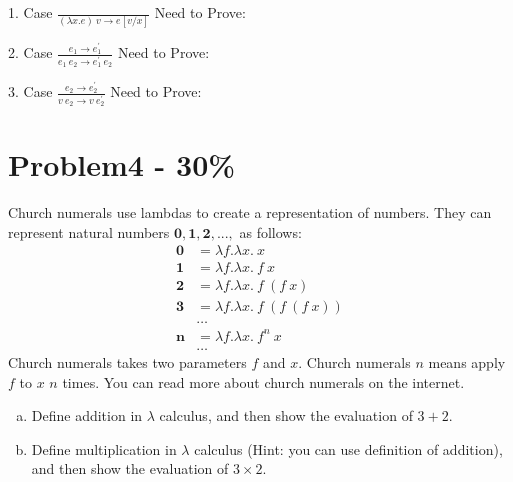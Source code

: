 \documentclass{article}
\newcommand{\answerbox}{
    \vspace{7cm} %
}
\begin{document}
1. Case $\frac{}{(\lambda x.e)\ v \rightarrow e [v/x]}$
Need to Prove:
\answerbox

2. Case $\frac{e_1 \rightarrow e_1^{'}}{e_1\ e_2 \rightarrow e_1^{'}\ e_2}$
Need to Prove:
\answerbox

3. Case $\frac{e_2 \rightarrow e_2^{'}}{v\ e_2 \rightarrow v\ e_2^{'}}$
Need to Prove:
\answerbox


\section*{Problem4 - 30\%}
Church numerals use lambdas to create a representation of numbers.
They can represent natural numbers $\mathbf{0}, \mathbf{1}, \mathbf{2}, ...,$ as follows:
\begin{align*}
    \mathbf{0} &= \lambda f.\lambda x.\ x \\
    \mathbf{1} &= \lambda f.\lambda x.\ f\ x \\
    \mathbf{2} &= \lambda f.\lambda x.\ f\ (f\ x) \\
    \mathbf{3} &= \lambda f.\lambda x.\ f\ (f\ (f\ x)) \\
    &\dots \\
    \mathbf{n} &= \lambda f.\lambda x.\ f^n\ x \\
    &\dots
\end{align*}
Church numerals takes two parameters $f$ and $x$. Church numerals $n$ means apply $f$ to $x$ $n$ times. You can read more about church numerals on the internet.
\begin{enumerate}[(a)]
    \item Define addition in $\lambda$ calculus, and then show the evaluation of $3+2$.
    \answerbox
    \item Define multiplication in $\lambda$ calculus (Hint: you can use definition of addition), and then show the evaluation of $3\times2$.
    \answerbox

\end{enumerate}

\vspace{20pt}
\end{document}
